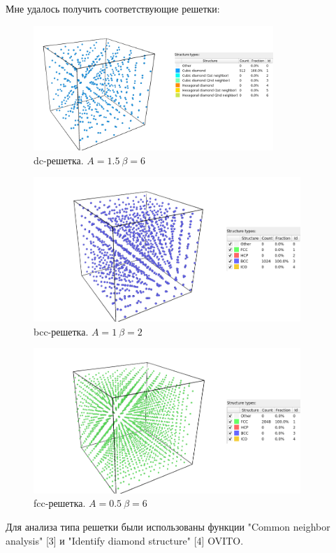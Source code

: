 \documentclass[12pt]{article}
\begin{document}
Мне удалось получить соответствующие решетки:
\begin{figure}[h]
\centering
\includegraphics[width=0.81\textwidth]{dc_all}
\caption{dc-решетка. $A=1.5 \ \beta=6$}
\end{figure}
\FloatBarrier
\begin{figure}[h]
\centering
\includegraphics[width=0.9\textwidth]{bc_all}
\caption{bcc-решетка. $A=1 \ \beta=2$}
\end{figure}
\FloatBarrier
\begin{figure}[h]
\centering
\includegraphics[width=0.9\textwidth]{fcc_all}
\caption{fcc-решетка. $A=0.5 \ \beta=6$}
\end{figure}
\FloatBarrier

Для анализа типа решетки были использованы функции "Common neighbor analysis" [3] и "Identify diamond structure" [4] OVITO.
\end{document}

